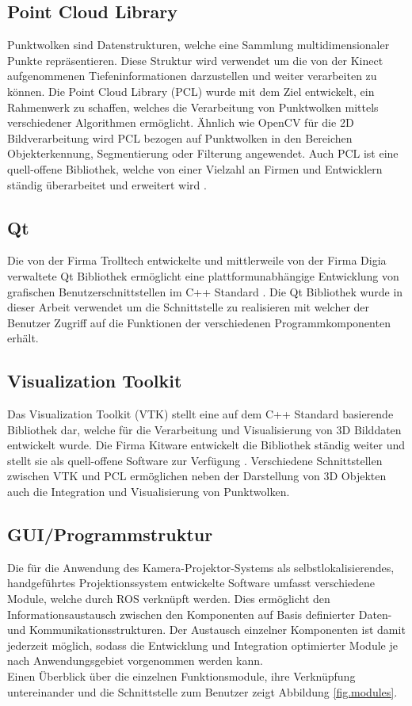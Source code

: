 \subsection{Point Cloud Library}
Punktwolken sind Datenstrukturen, welche eine Sammlung multidimensionaler Punkte repräsentieren. Diese Struktur wird verwendet um die von der Kinect aufgenommenen Tiefeninformationen darzustellen und weiter verarbeiten zu können. Die Point Cloud Library (PCL) wurde mit dem Ziel entwickelt, ein Rahmenwerk zu schaffen, welches die Verarbeitung von Punktwolken mittels verschiedener Algorithmen ermöglicht. Ähnlich wie OpenCV für die 2D Bildverarbeitung wird PCL bezogen auf Punktwolken in den Bereichen Objekterkennung, Segmentierung oder Filterung angewendet. Auch PCL ist eine quell-offene Bibliothek, welche von einer Vielzahl an Firmen und Entwicklern ständig überarbeitet und erweitert wird \cite{PCL}.

\subsection{Qt}
Die von der Firma Trolltech entwickelte und mittlerweile von der Firma Digia verwaltete Qt Bibliothek ermöglicht eine plattformunabhängige Entwicklung von grafischen Benutzerschnittstellen im C++ Standard \cite{Qt}. Die Qt Bibliothek wurde in dieser Arbeit verwendet um die Schnittstelle zu realisieren mit welcher der Benutzer Zugriff auf die Funktionen der verschiedenen Programmkomponenten erhält.

\subsection{Visualization Toolkit}
Das Visualization Toolkit (VTK) stellt eine auf dem C++ Standard basierende Bibliothek dar, welche für die Verarbeitung und Visualisierung von 3D Bilddaten entwickelt wurde. Die Firma Kitware entwickelt die Bibliothek ständig weiter und stellt sie als quell-offene Software zur Verfügung \cite{VTK}. Verschiedene Schnittstellen zwischen VTK und PCL ermöglichen neben der Darstellung von 3D Objekten auch die Integration und Visualisierung von Punktwolken.

\subsection{GUI/Programmstruktur}
Die für die Anwendung des Kamera-Projektor-Systems als selbstlokalisierendes, handgeführtes Projektionssystem entwickelte Software umfasst verschiedene Module, welche durch ROS verknüpft werden. Dies ermöglicht den Informationsaustausch zwischen den Komponenten auf Basis definierter Daten- und Kommunikationsstrukturen. Der Austausch einzelner Komponenten ist damit jederzeit möglich, sodass die Entwicklung und Integration optimierter Module je nach Anwendungsgebiet vorgenommen werden kann.\\
Einen Überblick über die einzelnen Funktionsmodule, ihre Verknüpfung untereinander und die Schnittstelle zum Benutzer zeigt Abbildung \ref{fig.modules}.\\

